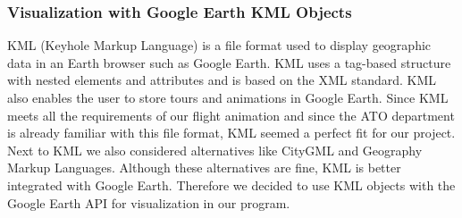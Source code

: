 \subsubsection{Visualization with Google Earth KML Objects}
KML (Keyhole Markup Language) is a file format used to display geographic data in an Earth browser such as Google Earth. KML uses a tag-based structure with nested elements and attributes and is based on the XML standard. KML also enables the user to store tours and animations in Google Earth. Since KML meets all the requirements of our flight animation and since the ATO department is already familiar with this file format, KML seemed a perfect fit for our project. Next to KML we also considered alternatives like CityGML and Geography Markup Languages. Although these alternatives are fine, KML is better integrated with Google Earth. Therefore we decided to use KML objects with the Google Earth API for visualization in our program. 
